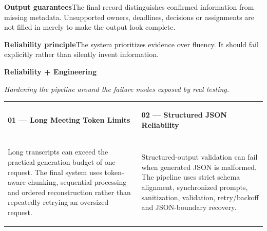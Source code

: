 \documentclass[9pt,a4paper]{extarticle}
\newcommand{\tagline}[1]{{\large\color{charcoal}\itshape #1\par}}
\begin{document}
\vspace{4pt}
\begin{card}
\textbf{Output guarantees}\quad The final record distinguishes confirmed information from missing metadata. Unsupported owners, deadlines, decisions or assignments are not filled in merely to make the output look complete.
\end{card}

\vspace{8pt}
\begin{darkcard}
\textbf{Reliability principle}\quad The system prioritizes evidence over fluency. It should fail explicitly rather than silently invent information.
\end{darkcard}
\newpage

{\fontsize{22}{25}\selectfont\bfseries Reliability + Engineering\par}
\tagline{Hardening the pipeline around the failure modes exposed by real testing.}
\vspace{4pt}

\begin{tabularx}{\textwidth}{@{}XX@{}}
\begin{darkcard}\textbf{01 — Long Meeting Token Limits}\end{darkcard}&
\begin{darkcard}\textbf{02 — Structured JSON Reliability}\end{darkcard}
\\
\begin{card}
Long transcripts can exceed the practical generation budget of one request. The final system uses token-aware chunking, sequential processing and ordered reconstruction rather than repeatedly retrying an oversized request.
\end{card}&
\begin{card}
Structured-output validation can fail when generated JSON is malformed. The pipeline uses strict schema alignment, synchronized prompts, sanitization, validation, retry/backoff and JSON-boundary recovery.
\end{card}
\end{tabularx}
\end{document}
